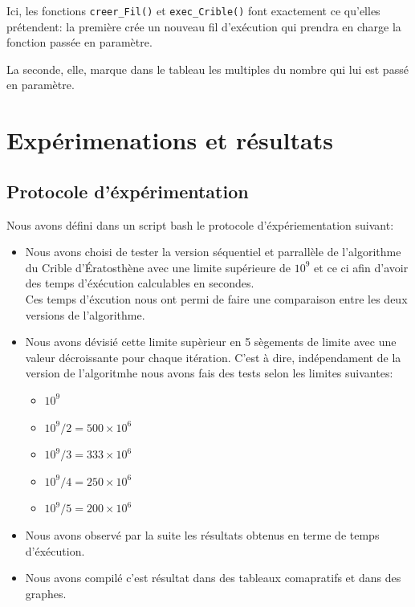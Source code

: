 \documentclass{report}
\def\code#1{\texttt{#1}} %
\begin{document}
		\bigskip
		Ici, les fonctions \code{creer\_Fil()} et \code{exec\_Crible()}
		font exactement ce qu'elles prétendent: la première crée un nouveau fil
		d'exécution qui prendra en charge la fonction passée en paramètre.

		\smallskip
		La seconde, elle, marque dans le tableau les multiples du nombre qui
		lui est passé en paramètre.

\chapter{Expérimenations et résultats}
\section{Protocole d'éxpérimentation}
Nous avons défini dans un script bash le protocole d'éxpériementation suivant:
\begin{itemize}
	\item Nous avons choisi de tester la version séquentiel et parrallèle de l'algorithme du Crible d'Ératosthène
	avec une limite supérieure de $10^{9}$ et ce ci afin d'avoir des temps d'éxécution calculables
	en secondes.\\
	Ces temps d'éxcution nous ont permi de faire une comparaison entre les deux versions de l'algorithme.
	\item Nous avons dévisié cette limite supèrieur en 5 sègements de limite avec une valeur décroissante pour chaque itération.
	C'est à dire, indépendament de la version de l'algoritmhe nous avons fais des tests selon les limites suivantes:
	\begin{itemize}
		\item $10^{9}$
		\item $10^{9}/2=500\times10^{6}$
		\item $10^{9}/3=333\times10^{6}$
		\item $10^{9}/4=250\times10^{6}$
		\item $10^{9}/5=200\times10^{6}$
	\end{itemize}
	\item Nous avons observé par la suite les résultats obtenus en terme de temps d'éxécution.
	\item Nous avons compilé c'est résultat dans des tableaux comapratifs et dans des graphes.
\end{itemize}
\end{document}
